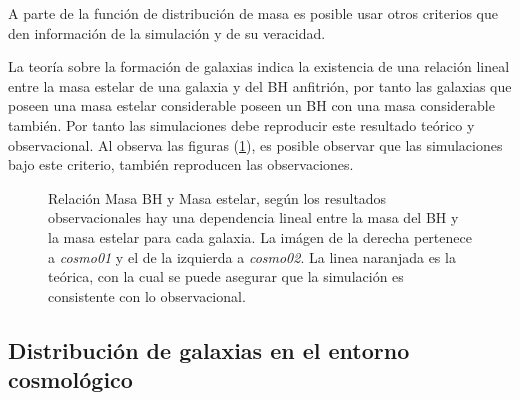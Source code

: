 A parte de la función de distribución de masa es posible usar otros criterios que den información de la simulación y de su veracidad. 

La teoría sobre la formación de galaxias indica la existencia de una relación lineal entre la masa estelar de una galaxia y del BH anfitrión, por tanto las galaxias que poseen una masa estelar considerable poseen un BH con una masa considerable también. Por tanto las simulaciones debe reproducir este resultado teórico y observacional. Al observa las figuras (\ref{fig: Mass_bhVsMass_stelar}), es posible observar que las simulaciones bajo este criterio, también reproducen las observaciones. 
%
 \begin{figure}
 \centering
 \caption{Relación Masa BH y Masa estelar, según los resultados observacionales hay una dependencia lineal entre la masa del BH y la masa estelar para cada galaxia. La imágen de la derecha pertenece a {\it{cosmo01}} y el de la izquierda a {\it{cosmo02}}. La linea naranjada es la teórica\cite{McConnell2013}, con la cual se puede asegurar que la simulación es consistente con lo observacional.}
 \label{fig: Mass_bhVsMass_stelar}
\end{figure}
%
    \subsection{ Distribución de galaxias en el entorno cosmológico}
    \label{subsec: Distribucion de galaxias}

